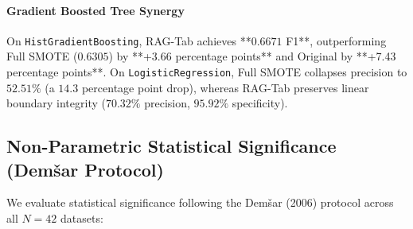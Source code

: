 \documentclass[sn-basic]{sn-jnl}
\begin{document}
\paragraph{Gradient Boosted Tree Synergy}
On \texttt{HistGradientBoosting}, RAG-Tab achieves **$0.6671$ F1**, outperforming Full SMOTE ($0.6305$) by **+3.66 percentage points** and Original by **+7.43 percentage points**. On \texttt{LogisticRegression}, Full SMOTE collapses precision to $52.51\%$ (a $14.3$ percentage point drop), whereas RAG-Tab preserves linear boundary integrity ($70.32\%$ precision, $95.92\%$ specificity).

\subsection{Non-Parametric Statistical Significance (Dem\v{s}ar Protocol)}
\label{subsec:statistical_significance}
We evaluate statistical significance following the Dem\v{s}ar (2006) protocol across all $N = 42$ datasets:
\end{document}

